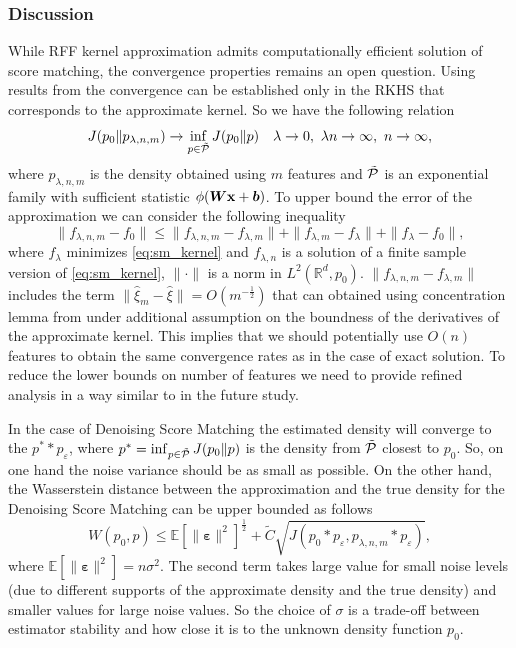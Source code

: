 \subsubsection{Discussion}

While RFF kernel approximation admits computationally efficient solution of score matching,
the convergence properties remains an open question.
Using results from \cite{Gretton2013} the convergence can be established only in the
RKHS that corresponds to the approximate kernel.
So we have the following relation
\[
    J(p_0\| p_{\lambda, n, m}) \to \inf_{p \in \Tilde{{\cal P}}}J(p_0\| p)
    \quad
    \lambda \to 0,~\lambda n \to \infty,~n \to \infty,
\]
where $p_{\lambda, n, m}$ is the density obtained using $m$ features and
$\Tilde{{\cal P}}$ is an exponential family with sufficient statistic
$\phi({\bm W}{\bf x} + {\bm b})$.
To upper bound the error of the approximation we
can consider the following inequality
\[
    \|f_{\lambda, n, m} - f_0\| \leq
        \|f_{\lambda, n, m} - f_{\lambda, m}\| +
        \|f_{\lambda, m} - f_{\lambda}\| +
        \|f_{\lambda} - f_0\|,
\]
where $f_{\lambda}$ minimizes \eqref{eq:sm_kernel} and
$f_{\lambda, n}$ is a solution of a finite sample version of \eqref{eq:sm_kernel},
$\|\cdot\|$ is a norm in $L^2({\mathbb{R}^d}, p_0)$.
$\|f_{\lambda,n, m} - f_{\lambda, m}\|$ includes the term $\|\hat{\xi}_m - \hat{\xi}\| = O(m^{-\frac{1}{2}})$ that can obtained using concentration lemma from
\cite{sutherland2017efficient} under additional assumption on the boundness
of the derivatives of the approximate kernel.
This implies that we should potentially use $O(n)$ features to obtain the same
convergence rates as in the case of exact solution.
To reduce the lower bounds on number of features
we need to provide refined analysis in a way similar to
\cite{aless2016generalization, li2018unified} in the future study.

In the case of Denoising Score Matching the estimated density will converge to the
$p^* * p_{\varepsilon}$, where $p^* = \inf_{p \in \Tilde{{\cal P}}}J(p_0\| p)$
is the density from $\Tilde{\mathcal{P}}$ closest to $p_0$.
So, on one hand the noise variance should be as small as possible.
On the other hand, the Wasserstein distance
between the approximation and the true density for the
Denoising Score Matching can be upper bounded as follows
\[
    W(p_0, p) \leq
    \mathbb{E}[\|{\bm \varepsilon}\|^2]^{\frac{1}{2}} +
    \tilde{C}\sqrt{J(p_0 * p_{\varepsilon}, p_{\lambda, n, m} * p_{\varepsilon})},
\]
where $\mathbb{E}[\|{\bm \varepsilon}\|^2] = n\sigma^2$.
The second term takes large value for small noise levels (due to different supports
of the approximate density and the true density)
and smaller values for large noise values.
So the choice of $\sigma$ is a trade-off between estimator stability and
how close it is to the unknown density function $p_0$.


